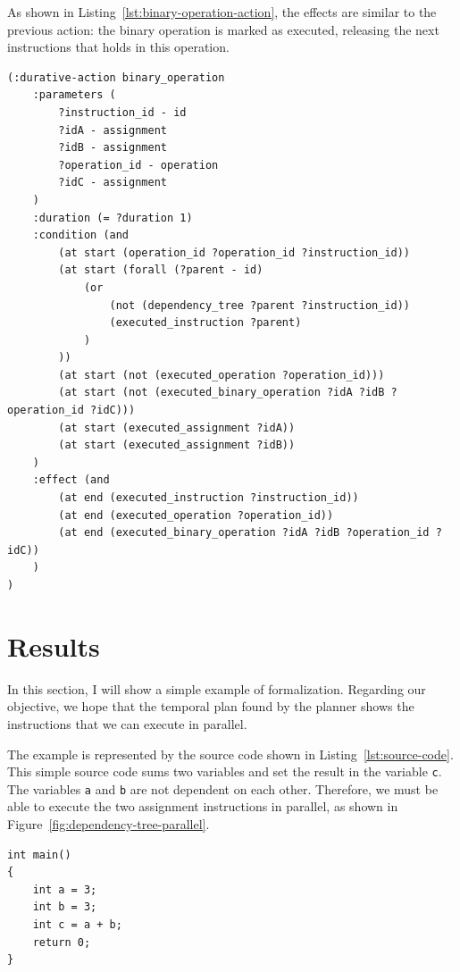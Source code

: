 \documentclass[letterpaper]{article}
\begin{document}
As shown in Listing~\ref{lst:binary-operation-action}, the effects are similar to the previous action: the binary operation is marked as executed, releasing the next instructions that holds in this operation.

\begin{lstlisting}[caption=Formalization of the binary operation action,label=lst:binary-operation-action,style=pddlStyle]
(:durative-action binary_operation
    :parameters (
        ?instruction_id - id
        ?idA - assignment
        ?idB - assignment
        ?operation_id - operation
        ?idC - assignment
    )
    :duration (= ?duration 1)
    :condition (and
        (at start (operation_id ?operation_id ?instruction_id))
        (at start (forall (?parent - id)
            (or
                (not (dependency_tree ?parent ?instruction_id))
                (executed_instruction ?parent)
            )
        ))
        (at start (not (executed_operation ?operation_id)))
        (at start (not (executed_binary_operation ?idA ?idB ?operation_id ?idC)))
        (at start (executed_assignment ?idA))
        (at start (executed_assignment ?idB))
    )
    :effect (and
        (at end (executed_instruction ?instruction_id))
        (at end (executed_operation ?operation_id))
        (at end (executed_binary_operation ?idA ?idB ?operation_id ?idC))
    )
)
\end{lstlisting}

\section{Results}

In this section, I will show a simple example of formalization. Regarding our objective, we hope that the temporal plan found by the planner shows the instructions that we can execute in parallel.

The example is represented by the source code shown in Listing~\ref{lst:source-code}. This simple source code sums two variables and set the result in the variable \texttt{c}. The variables \texttt{a} and \texttt{b} are not dependent on each other. Therefore, we must be able to execute the two assignment instructions in parallel, as shown in Figure~\ref{fig:dependency-tree-parallel}.

\begin{lstlisting}[caption=Source code,label=lst:source-code,style=cppStyle]
int main()
{
    int a = 3;
    int b = 3;
    int c = a + b;
    return 0;
}
\end{lstlisting}
\end{document}
